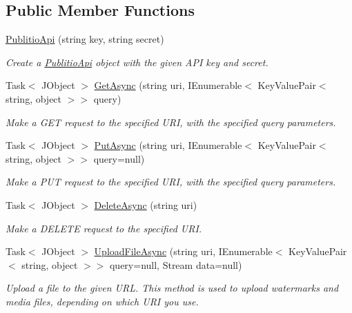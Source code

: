 \subsection*{Public Member Functions}
\begin{DoxyCompactItemize}
\item 
\hyperlink{classPublitio_1_1PublitioApi_a811c5cc6ed896f6dc67ed978778f96c0}{Publitio\+Api} (string key, string secret)
\begin{DoxyCompactList}\small\item\em Create a \hyperlink{classPublitio_1_1PublitioApi}{Publitio\+Api} object with the given A\+PI key and secret.\end{DoxyCompactList}\item 
Task$<$ J\+Object $>$ \hyperlink{classPublitio_1_1PublitioApi_ac85f19513ef13229beb581bd9ade024d}{Get\+Async} (string uri, I\+Enumerable$<$ Key\+Value\+Pair$<$ string, object $>$$>$ query)
\begin{DoxyCompactList}\small\item\em Make a G\+ET request to the specified U\+RI, with the specified query parameters.\end{DoxyCompactList}\item 
Task$<$ J\+Object $>$ \hyperlink{classPublitio_1_1PublitioApi_aa938b3d9b61bffa8bb341961252feba3}{Put\+Async} (string uri, I\+Enumerable$<$ Key\+Value\+Pair$<$ string, object $>$$>$ query=null)
\begin{DoxyCompactList}\small\item\em Make a P\+UT request to the specified U\+RI, with the specified query parameters.\end{DoxyCompactList}\item 
Task$<$ J\+Object $>$ \hyperlink{classPublitio_1_1PublitioApi_a313b32f45d254eac9e2b91de60622bc9}{Delete\+Async} (string uri)
\begin{DoxyCompactList}\small\item\em Make a D\+E\+L\+E\+TE request to the specified U\+RI.\end{DoxyCompactList}\item 
Task$<$ J\+Object $>$ \hyperlink{classPublitio_1_1PublitioApi_ac6d4d7d81b49bad05168f2c4e60bb884}{Upload\+File\+Async} (string uri, I\+Enumerable$<$ Key\+Value\+Pair$<$ string, object $>$$>$ query=null, Stream data=null)
\begin{DoxyCompactList}\small\item\em Upload a file to the given U\+RL. This method is used to upload watermarks and media files, depending on which U\+RI you use.\end{DoxyCompactList}\end{DoxyCompactItemize}


